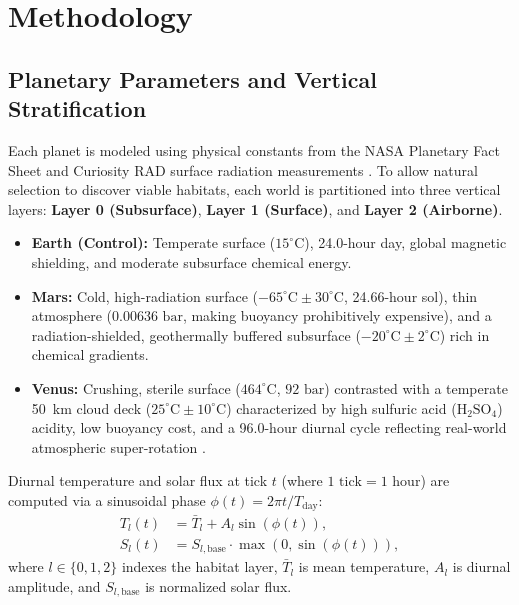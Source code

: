\documentclass[conference]{IEEEtran}
\begin{document}
\section{Methodology}

\subsection{Planetary Parameters and Vertical Stratification}
Each planet is modeled using physical constants from the NASA Planetary Fact Sheet \cite{nasa_factsheet} and Curiosity RAD surface radiation measurements \cite{hassler2014mars}. To allow natural selection to discover viable habitats, each world is partitioned into three vertical layers: \textbf{Layer 0 (Subsurface)}, \textbf{Layer 1 (Surface)}, and \textbf{Layer 2 (Airborne)}.

\begin{itemize}
    \item \textbf{Earth (Control):} Temperate surface ($15^\circ\text{C}$), 24.0-hour day, global magnetic shielding, and moderate subsurface chemical energy.
    \item \textbf{Mars:} Cold, high-radiation surface ($-65^\circ\text{C} \pm 30^\circ\text{C}$, 24.66-hour sol), thin atmosphere ($0.00636\text{ bar}$, making buoyancy prohibitively expensive), and a radiation-shielded, geothermally buffered subsurface ($-20^\circ\text{C} \pm 2^\circ\text{C}$) rich in chemical gradients.
    \item \textbf{Venus:} Crushing, sterile surface ($464^\circ\text{C}$, $92\text{ bar}$) contrasted with a temperate 50~km cloud deck ($25^\circ\text{C} \pm 10^\circ\text{C}$) characterized by high sulfuric acid ($\text{H}_2\text{SO}_4$) acidity, low buoyancy cost, and a 96.0-hour diurnal cycle reflecting real-world atmospheric super-rotation \cite{seager2021venus}.
\end{itemize}

Diurnal temperature and solar flux at tick $t$ (where $1\text{ tick} = 1\text{ hour}$) are computed via a sinusoidal phase $\phi(t) = 2\pi t / T_{\text{day}}$:
\begin{align}
    T_l(t) &= \bar{T}_l + A_l \sin(\phi(t)), \\
    S_l(t) &= S_{l,\text{base}} \cdot \max(0, \sin(\phi(t))),
\end{align}
where $l \in \{0, 1, 2\}$ indexes the habitat layer, $\bar{T}_l$ is mean temperature, $A_l$ is diurnal amplitude, and $S_{l,\text{base}}$ is normalized solar flux.
\end{document}
